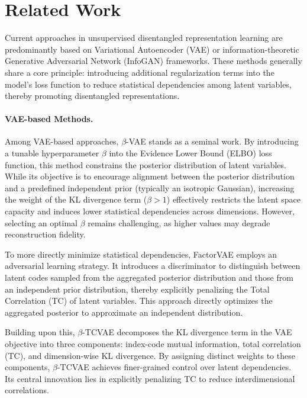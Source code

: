 \section{Related Work}
Current approaches in unsupervised disentangled representation learning are predominantly based on Variational Autoencoder (VAE) \cite{kingma2013auto} or information-theoretic Generative Adversarial Network (InfoGAN) \cite{chen2016infogan} frameworks. These methods generally share a core principle: introducing additional regularization terms into the model's loss function to reduce statistical dependencies among latent variables, thereby promoting disentangled representations.
\paragraph{VAE-based Methods.} Among VAE-based approaches, $\beta$-VAE \cite{higgins2017beta,burgess2018understanding} stands as a seminal work. By introducing a tunable hyperparameter $\beta$ into the Evidence Lower Bound (ELBO) loss function, this method constrains the posterior distribution of latent variables. While its objective is to encourage alignment between the posterior distribution and a predefined independent prior (typically an isotropic Gaussian), increasing the weight of the KL divergence term ($\beta > 1$) effectively restricts the latent space capacity and induces lower statistical dependencies across dimensions. However, selecting an optimal $\beta$ remains challenging, as higher values may degrade reconstruction fidelity. 

To more directly minimize statistical dependencies, FactorVAE \cite{kim2018disentangling} employs an adversarial learning strategy. It introduces a discriminator to distinguish between latent codes sampled from the aggregated posterior distribution and those from an independent prior distribution, thereby explicitly penalizing the Total Correlation (TC) of latent variables. This approach directly optimizes the aggregated posterior to approximate an independent distribution.

Building upon this, $\beta$-TCVAE \cite{chen2018isolating} decomposes the KL divergence term in the VAE objective into three components: index-code mutual information, total correlation (TC), and dimension-wise KL divergence. By assigning distinct weights to these components, $\beta$-TCVAE achieves finer-grained control over latent dependencies. Its central innovation lies in explicitly penalizing TC to reduce interdimensional correlations.
